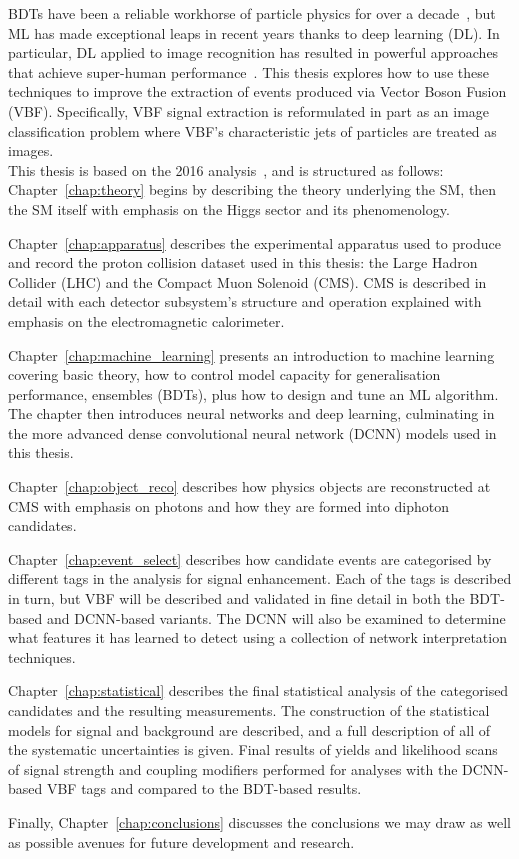 BDTs have been a reliable workhorse of particle physics for over a decade~\cite{MiniBooneBDT}, but ML has made exceptional leaps in recent years thanks to deep learning (DL).
In particular, DL applied to image recognition has resulted in powerful approaches that achieve super-human performance~\cite{ResNet}. 
This thesis explores how to use these techniques to improve the extraction of \Hgg events produced via Vector Boson Fusion (VBF). 
Specifically, VBF signal extraction is reformulated in part as an image classification problem where VBF's characteristic jets of particles are treated as images.  
\\

This thesis is based on the 2016 \Hgg analysis~\cite{HIG-16-040}, and is structured as follows: Chapter~\ref{chap:theory} begins by describing the theory underlying the SM, then the SM itself with emphasis on the Higgs sector and its phenomenology. 

Chapter~\ref{chap:apparatus} describes the experimental apparatus used to produce and record the proton collision dataset used in this thesis: the Large Hadron Collider (LHC) and the Compact Muon Solenoid (CMS). CMS is described in detail with each detector subsystem's structure and operation explained with emphasis on the electromagnetic calorimeter.

Chapter~\ref{chap:machine_learning} presents an introduction to machine learning covering basic theory, how to control model capacity for generalisation performance, ensembles (BDTs), plus how to design and tune an ML algorithm. The chapter then introduces neural networks and deep learning, culminating in the more advanced dense convolutional neural network (DCNN) models used in this thesis. 

Chapter~\ref{chap:object_reco} describes how physics objects are reconstructed at CMS with emphasis on photons and how they are formed into \Hgg diphoton candidates.

Chapter~\ref{chap:event_select} describes how candidate \Hgg events are categorised by different tags in the analysis for signal enhancement.  
Each of the tags is described in turn, but VBF will be described and validated in fine detail in both the BDT-based and DCNN-based variants. 
The DCNN will also be examined to determine what features it has learned to detect using a collection of network interpretation techniques.

Chapter~\ref{chap:statistical} describes the final statistical analysis of the categorised \Hgg candidates and the resulting measurements.
The construction of the statistical models for signal and background are described, and a full description of all of the systematic uncertainties is given. 
Final results of yields and likelihood scans of signal strength and coupling modifiers performed for analyses with the DCNN-based VBF tags and compared to the BDT-based results. 

Finally, Chapter~\ref{chap:conclusions} discusses the conclusions we may draw as well as possible avenues for future development and research. 




